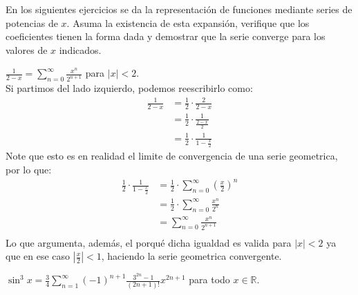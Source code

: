 \documentclass[../main.tex]{subfiles}
\begin{document}
En los siguientes ejercicios se da la representación de funciones mediante series de potencias de $x$. Asuma la existencia de esta expansión, verifique que los coeficientes tienen la forma dada y demostrar que la serie converge para los valores de $x$ indicados.

\question $\frac{1}{2-x} = \sum\limits_{n = 0}^\infty \frac{x^n}{2^{n+1}}$ para $|x| < 2$.\\

Si partimos del lado izquierdo, podemos reescribirlo como:
\begin{align*}
    \frac{1}{2-x} &= \frac{1}{2} \cdot \frac{2}{2-x}\\
    &= \frac{1}{2} \cdot \frac{1}{\frac{2-x}{2}}\\
    &= \frac{1}{2} \cdot \frac{1}{1 - \frac{x}{2}}
\end{align*}
Note que esto es en realidad el limite de convergencia de una serie geometrica, por lo que:
\begin{align*}
    \frac{1}{2} \cdot \frac{1}{1 - \frac{x}{2}} &= \frac{1}{2} \cdot \sum_{n = 0}^\infty \left(\frac{x}{2}\right)^n\\
    &= \frac{1}{2} \cdot \sum_{n = 0}^\infty \frac{x^n}{2^n}\\
    &= \sum_{n = 0}^\infty \frac{x^n}{2^{n+1}}\\
\end{align*}
Lo que argumenta, además, el porqué dicha igualdad es valida para $|x| < 2$ ya que en ese caso $\left|\frac{x}{2}\right| < 1$, haciendo la serie geometrica convergente.


\question $\sin^3 x = \frac{3}{4} \sum\limits_{n = 1}^\infty (-1)^{n+1} \frac{3^{2n}-1}{(2n+1)!}x^{2n+1}$ para todo $x \in \mathbb{R}$.\\
\end{document}
